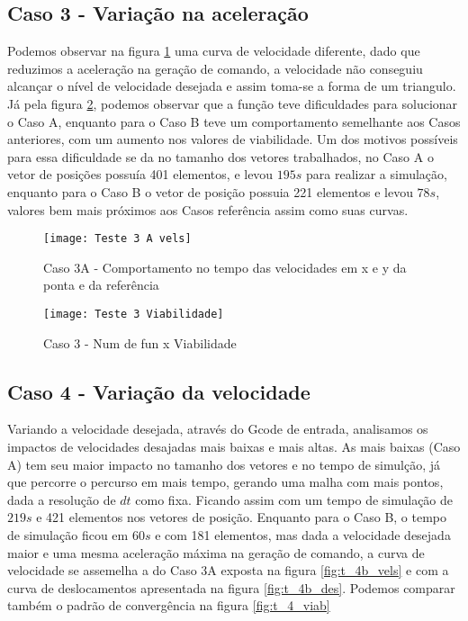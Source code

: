 \subsection{Caso 3 - Variação na aceleração}
Podemos observar na figura \ref{fig:t_3a_vels} uma curva de velocidade diferente, dado que reduzimos a aceleração
na geração de comando, a velocidade não conseguiu alcançar o nível de velocidade desejada e assim toma-se a forma de um triangulo.
Já pela figura \ref{fig:t_3_viab}, podemos observar que a função teve dificuldades para solucionar o Caso A, enquanto para o Caso B
teve um comportamento semelhante aos Casos anteriores, com um aumento nos valores de viabilidade.
Um dos motivos possíveis para essa dificuldade se da no tamanho dos vetores trabalhados, no Caso A o vetor de posições
possuía 401 elementos, e levou $195 s$ para realizar a simulação, enquanto para o Caso B o vetor de posição possuia 221 elementos
e levou $78 s$, valores bem mais próximos aos Casos referência assim como suas curvas.

\begin{figure}[!htb]
    \begin{center}
    \caption{Caso 3A - Comportamento no tempo das velocidades em x e y da ponta e da referência}
    \texttt{[image: Teste 3 A vels]}
    \label{fig:t_3a_vels}
    \end{center}
\end{figure}

\begin{figure}[!htb]
    \begin{center}
    \caption{Caso 3 - Num de fun x Viabilidade}
    \texttt{[image: Teste 3 Viabilidade]}
    \label{fig:t_3_viab}
    \end{center}
\end{figure}

\subsection{Caso 4 - Variação da velocidade}
Variando a velocidade desejada, através do Gcode de entrada, analisamos os impactos de velocidades desajadas mais baixas e mais altas.
As mais baixas (Caso A) tem seu maior impacto no tamanho dos vetores e no tempo de simulção, já que percorre o percurso em mais tempo,
gerando uma malha com mais pontos, dada a resolução de $dt$ como fixa. Ficando assim com um tempo de simulação de $219 s$ e 421 elementos nos vetores de posição.
Enquanto para o Caso B, o tempo de simulação ficou em $60 s$ e com 181 elementos, mas dada a velocidade desejada maior e uma mesma aceleração máxima
na geração de comando, a curva de velocidade se assemelha a do Caso 3A exposta na figura \ref{fig:t_4b_vels} e com a curva de deslocamentos apresentada na figura \ref{fig:t_4b_des}.
Podemos comparar também o padrão de convergência na figura \ref{fig:t_4_viab}

